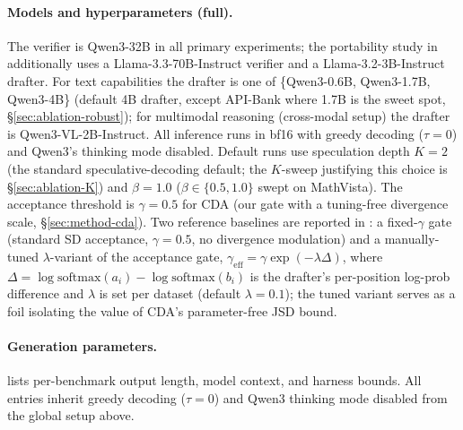 \documentclass[11pt]{article}
\newcommand{\crchange}[1]{#1}
\theoremstyle{plain}
\theoremstyle{definition}
\begin{document}
\paragraph{Models and hyperparameters (full).}
\crchange{The verifier is Qwen3-32B in all primary experiments; the portability study in \Cref{appx:cross-family} additionally uses a Llama-3.3-70B-Instruct verifier and a Llama-3.2-3B-Instruct drafter.} For text capabilities the drafter is one of \{Qwen3-0.6B, Qwen3-1.7B, Qwen3-4B\} (default 4B drafter, except API-Bank where 1.7B is the sweet spot, \S\ref{sec:ablation-robust}); for multimodal reasoning (cross-modal setup) the drafter is Qwen3-VL-2B-Instruct. All inference runs in bf16 with greedy decoding ($\tau{=}0$) and Qwen3's thinking mode disabled. Default runs use speculation depth $K{=}2$ (the standard speculative-decoding default; the $K$-sweep justifying this choice is \S\ref{sec:ablation-K}) and $\beta{=}1.0$ ($\beta\in\{0.5,1.0\}$ swept on MathVista). The acceptance threshold is $\gamma{=}0.5$ for CDA (our gate with a tuning-free divergence scale, \S\ref{sec:method-cda}). Two reference baselines are reported in : a fixed-$\gamma$ gate (standard SD acceptance, $\gamma{=}0.5$, no divergence modulation) and a manually-tuned $\lambda$-variant of the acceptance gate, $\gamma_{\text{eff}}=\gamma\exp(-\lambda\Delta)$, where $\Delta=\log\mathrm{softmax}(a_i)-\log\mathrm{softmax}(b_i)$ is the drafter's per-position log-prob difference and $\lambda$ is set per dataset (default $\lambda{=}0.1$); the tuned variant serves as a foil isolating the value of CDA's parameter-free JSD bound.

\paragraph{Generation parameters.}
 lists per-benchmark output length, model context, and harness bounds. All entries inherit greedy decoding ($\tau{=}0$) and Qwen3 thinking mode disabled from the global setup above.
\end{document}
